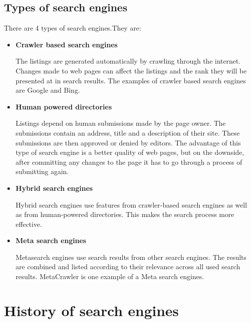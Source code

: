 \documentclass[10pt,a4paper]{article}
\begin{document}
\subsection{Types of search engines}
There are 4 types of search engines.\cite{TK-SE}They are:
\begin{itemize}
\item \textbf{Crawler based search engines} 

The listings are generated automatically by crawling through the internet. Changes made to web pages can affect the listings and the rank they will be presented at in search results. The examples of crawler based search engines are Google and Bing. 

\item \textbf{Human powered directories}

Listings depend on human submissions made by the page owner. The submissions contain an address, title and a description of their site. These submissions are then approved or denied by editors. The advantage of this type of search engine is a better quality of web pages, but on the downside, after committing any changes to the page it has to go through a process of submitting again. 

\item \textbf{Hybrid search engines}

Hybrid search engines use features from crawler-based search engines as well as from human-powered directories. This makes the search process more effective.

\item \textbf{Meta search engines}

Metasearch engines use search results from other search engines. The results are combined and listed according to their relevance across all used search results. MetaCrawler is one example of a Meta search engines.
\end{itemize}

\section{History of search engines}
\end{document}
